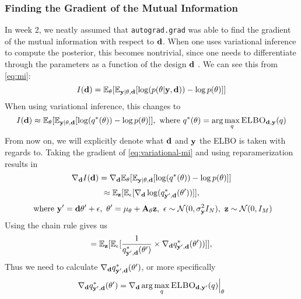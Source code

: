 \subsubsection{Finding the Gradient of the Mutual Information}
In week 2, we neatly assumed that \texttt{autograd.grad} was able to find the gradient 
of the mutual information with respect to $\mathbf{d}$. 
When one uses variational inference to compute the posterior, this becomes nontrivial, since one needs to differentiate through the parameters as a function of the design $\mathbf{d}$ \cite{lorraine19}.
We can see this from \eqref{eq:mi}:
\begin{equation}I(\mathbf{d}) = \mathbb{E}_{\mathbf{\theta}}[\mathbb{E}_{\mathbf{y} | \theta, \mathbf{d}}[\log (p(\theta | \mathbf{y}, \mathbf{d})) - \log p(\theta)]]\end{equation}
When using variational inference, this changes to
\begin{equation}\label{eq:variational-mi}I(\mathbf{d}) \approx \mathbb{E}_{\mathbf{\theta}}[\mathbb{E}_{\mathbf{y}|\theta, \mathbf{d}}[\log (q^*(\theta)) - \log p(\theta)]],\ \textrm{where}\ q^*(\theta) = \arg \max_q \textsc{ELBO}_{\mathbf{d}, \mathbf{y}}(q)\end{equation}
From now on, we will explicitly denote what $\mathbf{d}$ and $\mathbf{y}$ the ELBO is taken with regards to.
Taking the gradient of \eqref{eq:variational-mi} and using reparamerization results in
\begin{equation}\nabla_{\mathbf{d}} I(\mathbf{d}) = \nabla_{\mathbf{d}}\mathbb{E}_{\mathbf{\theta}}[\mathbb{E}_{\mathbf{y} | \theta, \mathbf{d}}[\log (q^*(\theta)) - \log p(\theta)]]\label{eq:var-mi-reparam}\end{equation}
\begin{equation} \approx \mathbb{E}_{\mathbf{z}}[\mathbb{E}_{\mathbf{\epsilon}}[\nabla_{\mathbf{d}}\log (q^*_{\mathbf{y}', \mathbf{d}}(\theta'))]],\label{eq:inner-grad}\end{equation}
$$\ \textrm{where}\ \mathbf{y}' = \mathbf{d}\theta' + \epsilon,\ \theta' = \mu_\theta + \mathbf{A}_\theta\mathbf{z},\ \epsilon \sim \mathcal{N}(0, \sigma^2_{\mathbf{y}} I_N),\ \mathbf{z} \sim \mathcal{N}(0, I_M)$$
Using the chain rule gives us
\begin{equation}
  = \mathbb{E}_{\mathbf{z}}[\mathbb{E}_{\mathbf{\epsilon}}[\frac{1}{q^*_{\mathbf{y}', \mathbf{d}}(\theta')} \times \nabla_{\mathbf{d}} q^*_{\mathbf{y}', \mathbf{d}}(\theta'))]],
  \label{eq:variational-mi-2}
\end{equation}
Thus we need to calculate $\nabla_{\mathbf{d}} q^*_{\mathbf{y}', \mathbf{d}}(\theta')$, or more specifically
\begin{equation}
\nabla_{\mathbf{d}} q^*_{\mathbf{y}', \mathbf{d}}(\theta') = \nabla_{\mathbf{d}} \arg \max_q \textsc{ELBO}_{\mathbf{d}, \mathbf{y}'}(q)\Bigr\rvert_{\theta}
\end{equation}
